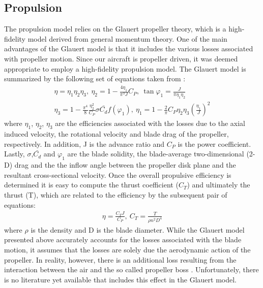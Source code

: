 \documentclass[conf]{new-aiaa}
\begin{document}
\subsection{Propulsion}
The propulsion model relies on the Glauert propeller theory, which is a high-fidelity model derived from general momentum theory. One of the main advantages of the Glauert model is that it includes the various losses associated with propeller motion. Since our aircraft is propeller driven, it was deemed appropriate to employ a high-fidelity propulsion model. The Glauert model is summarized by the following set of equations taken from \cite{israel}:
 \begin{equation}\label{modified_Cl}
 \begin{gathered}
\eta = \eta_{1}\eta_{2}\eta_{3},\:\eta_{2} = 1 - \frac{4\eta_{1}}{\pi^{3}J}C_{P},\:\tan\varphi_{1} =\frac{J}{\pi\eta_{1}\eta_{2}} \\ \eta_{3} = 1 - \frac{\pi^{4}}{8}\frac{\eta_{2}^{2}}{C_{P}}\sigma\bar{C_{d}}f(\varphi_{1}), \: \eta_{1} = 1 - \frac{2}{\pi}C_{P}\eta_{2}\eta_{3}\left(\frac{\eta_{1}}{J}\right)^{2}
   \end{gathered}
\end{equation}
where $\eta_{1}$, $\eta_{2}$, $\eta_{3}$ are the efficiencies associated with the losses due to the axial induced velocity, the rotational velocity and blade drag of the propeller, respectively. In addition, J is the advance ratio and $C_{P}$ is the power coefficient. Lastly, $\sigma$,$\bar{C_{d}}$ and $\varphi_{1}$ are the blade solidity, the blade-average two-dimensional (2-D) drag and the the inflow angle between the propeller disk plane and the resultant cross-sectional velocity. Once the overall propulsive efficiency is determined it is easy to compute the thrust coefficient ($C_{T}$) and ultimately the thrust (T), which are related to the efficiency by the subsequent pair of equations:
 \begin{equation}\label{modified_Cl}
 \begin{gathered}
\eta = \frac{C_{T}J}{C_{P}},\:C_{T}=\frac{T}{\rho n^{2}D^{4}}
   \end{gathered}
\end{equation}
where $\rho$ is the density and D is the blade diameter. While the Glauert model presented above accurately accounts for the losses associated with the blade motion, it assumes that the losses are solely due the aerodynamic action of the propeller. In reality, however, there is an additional loss resulting from the interaction between the air and the so called propeller boss \cite{aero}. Unfortunately, there is no literature yet available that includes this effect in the Glauert model.
\end{document}
